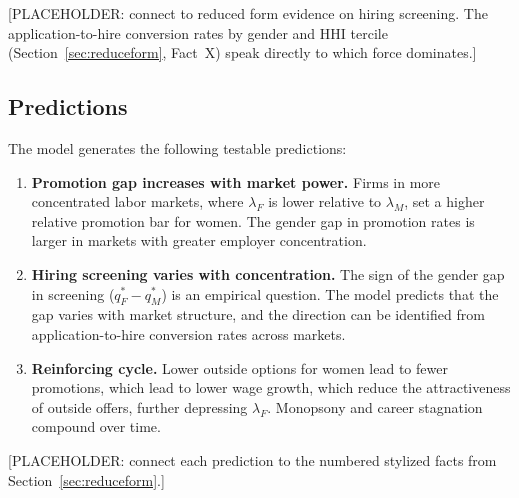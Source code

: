 \documentclass[11pt]{article}
\begin{document}
[PLACEHOLDER: connect to reduced form evidence on hiring screening. The application-to-hire conversion rates by gender and HHI tercile (Section~\ref{sec:reduceform}, Fact~X) speak directly to which force dominates.]

\subsection{Predictions}

The model generates the following testable predictions:

\begin{enumerate}
    \item \textbf{Promotion gap increases with market power.} Firms in more concentrated labor markets, where $\lambda_F$ is lower relative to $\lambda_M$, set a higher relative promotion bar for women. The gender gap in promotion rates is larger in markets with greater employer concentration.

    \item \textbf{Hiring screening varies with concentration.} The sign of the gender gap in screening ($q_F^* - q_M^*$) is an empirical question. The model predicts that the gap varies with market structure, and the direction can be identified from application-to-hire conversion rates across markets.

    \item \textbf{Reinforcing cycle.} Lower outside options for women lead to fewer promotions, which lead to lower wage growth, which reduce the attractiveness of outside offers, further depressing $\lambda_F$. Monopsony and career stagnation compound over time.
\end{enumerate}

[PLACEHOLDER: connect each prediction to the numbered stylized facts from Section~\ref{sec:reduceform}.]

\newpage


\end{document}
